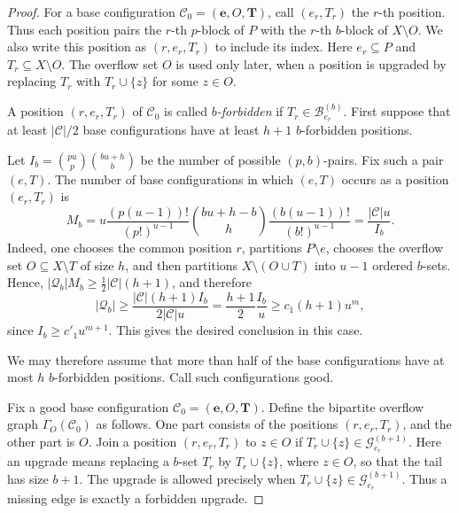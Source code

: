 \documentclass[10pt,a4paper]{amsart}
\newcommand{\G}{\mathcal G}
\begin{document}
\begin{proof}
        For a base configuration $\mathcal C_0=(\mathbf e,O,\mathbf T)$, call $(e_r,T_r)$ the $r$-th position.
        Thus each position pairs the $r$-th $p$-block of $P$ with the $r$-th $b$-block of $X\setminus O$.
        We also write this position as $(r,e_r,T_r)$ to include its index.
        Here $e_r\subseteq P$ and $T_r\subseteq X\setminus O$.
        The overflow set $O$ is used only later, when a position is upgraded by replacing $T_r$ with $T_r\cup\{z\}$ for some $z\in O$.

        A position $(r,e_r,T_r)$ of $\mathcal C_0$ is called \emph{$b$-forbidden} if $T_r\in\mathcal B_{e_r}^{(b)}$.
        First suppose that at least $|\mathcal C|/2$ base configurations have at least $h+1$ $b$-forbidden positions.

        Let $I_b=\binom{pu}{p}\binom{bu+h}{b}$ be the number of possible $(p,b)$-pairs.
        Fix such a pair $(e,T)$. The number of base configurations in which $(e,T)$ occurs as a position $(e_r,T_r)$ is
        \[
                M_b
                =
                u\frac{(p(u-1))!}{(p!)^{u-1}}\binom{bu+h-b}{h}\frac{(b(u-1))!}{(b!)^{u-1}}
                =
                \frac{|\mathcal C|u}{I_b}.
        \]
        Indeed, one chooses the common position $r$, partitions $P\setminus e$, chooses the overflow set $O\subseteq X\setminus T$ of size $h$, and then partitions $X\setminus(O\cup T)$ into $u-1$ ordered $b$-sets.
        Hence, $|\mathcal Q_b|M_b\ge\frac12|\mathcal C|(h+1)$, and therefore
        \[
                |\mathcal Q_b|
                \ge
                \frac{|\mathcal C|(h+1)I_b}{2|\mathcal C|u}
                =
                \frac{h+1}{2}\frac{I_b}{u}
                \ge
                c_1(h+1)u^m,
        \]
        since $I_b\ge c'_1u^{m+1}$.
        This gives the desired conclusion in this case.

        We may therefore assume that more than half of the base configurations have at most $h$ $b$-forbidden positions.
        Call such configurations good.

        Fix a good base configuration $\mathcal C_0=(\mathbf e,O,\mathbf T)$.
        Define the bipartite overflow graph $\Gamma_O(\mathcal C_0)$ as follows.
        One part consists of the positions $(r,e_r,T_r)$, and the other part is $O$.
        Join a position $(r,e_r,T_r)$ to $z\in O$ if $T_r\cup\{z\}\in\G_{e_r}^{(b+1)}$.
        Here an upgrade means replacing a $b$-set $T_r$ by $T_r\cup\{z\}$, where $z\in O$, so that the tail has size $b+1$.
        The upgrade is allowed precisely when $T_r\cup\{z\}\in\G_{e_r}^{(b+1)}$.
        Thus a missing edge is exactly a forbidden upgrade.


\end{proof}
\end{document}
